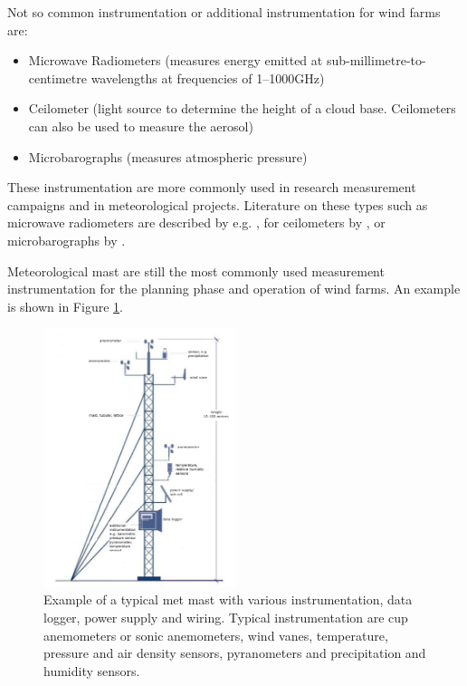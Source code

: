 Not so common instrumentation or additional instrumentation for wind farms are:
\begin{itemize}
    \item Microwave Radiometers (measures energy emitted at sub-millimetre-to-centimetre wavelengths at frequencies of 1–1000GHz)  
    \item Ceilometer (light source to determine the height of a cloud base. Ceilometers can also be used to measure the aerosol)
    \item Microbarographs (measures atmospheric pressure)
\end{itemize}

These instrumentation are more commonly used in research measurement campaigns and in meteorological projects. Literature on these types such as microwave radiometers are described by e.g.  \cite{Ulaby1982,Matzler2006}, for ceilometers by \cite{Morris2016}, or microbarographs by \cite{Monserrat1992}.




Meteorological mast are still the most commonly used measurement instrumentation for the planning phase and operation of wind farms. An example is shown in Figure \ref{fig:met_mast}. 


\begin{figure}[h!]
\center
\includegraphics[width=0.5\textwidth]{figures/typical_met_mast.png}
\caption{Example of a typical met mast with various instrumentation, data logger, power supply and wiring. Typical instrumentation are cup anemometers or sonic anemometers, wind vanes, temperature, pressure and air density sensors, pyranometers and precipitation and humidity  sensors.}
\label{fig:met_mast}
\end{figure}

